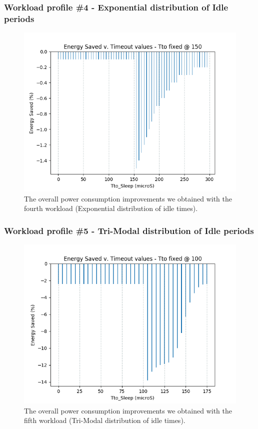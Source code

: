 \documentclass[a4paper]{article}
\begin{document}
        \subsubsection{Workload profile \#4 - Exponential distribution of Idle periods}
            \begin{figure}[htp]
                \centering
                \includegraphics[width=0.5 \columnwidth]{./screenshots/Sleep_case4.png}
                \caption{
                        \label{fig:Sleep_case4}
                        The overall power consumption improvements we obtained with the fourth workload (Exponential distribution of idle times).
                }
            \end{figure}

        \subsubsection{Workload profile \#5 - Tri-Modal distribution of Idle periods}

            \begin{figure}[htp]
                \centering
                \includegraphics[width=0.5 \columnwidth]{./screenshots/Sleep_case5.png}
                \caption{
                        \label{fig:Sleep_case5}
                        The overall power consumption improvements we obtained with the fifth workload (Tri-Modal distribution of idle times).
                }
            \end{figure}
\end{document}
